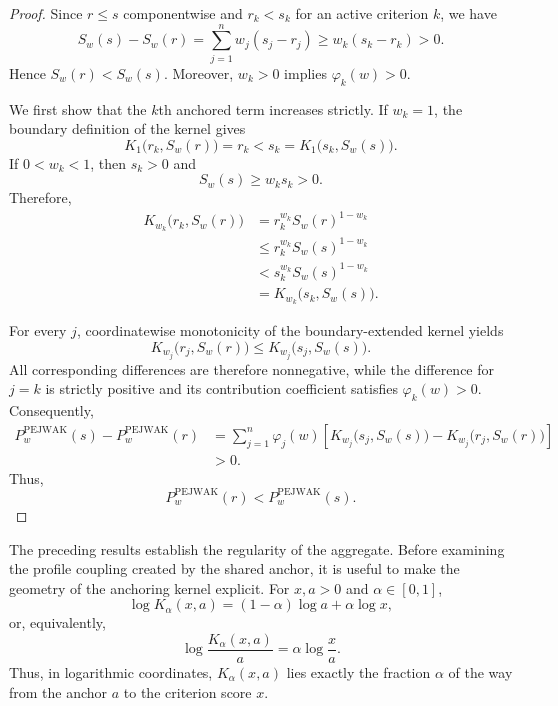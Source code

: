 \documentclass[reqno,11pt]{amsart}
\theoremstyle{definition}
\theoremstyle{plain}
\theoremstyle{remark}
\begin{document}
\begin{proof}
Since $r\leq s$ componentwise and $r_k<s_k$ for an active criterion
$k$, we have
\[
S_w(s)-S_w(r)
=
\sum_{j=1}^{n}w_j(s_j-r_j)
\geq
w_k(s_k-r_k)
>
0.
\]
Hence $S_w(r)<S_w(s)$. Moreover, $w_k>0$ implies
$\varphi_k(w)>0$.

We first show that the $k$th anchored term increases strictly. If
$w_k=1$, the boundary definition of the kernel gives
\[
K_{1}\bigl(r_k,S_w(r)\bigr)
=
r_k
<
s_k
=
K_{1}\bigl(s_k,S_w(s)\bigr).
\]
If $0<w_k<1$, then $s_k>0$ and
\[
S_w(s)\geq w_ks_k>0.
\]
Therefore,
\[
\begin{aligned}
K_{w_k}\bigl(r_k,S_w(r)\bigr)
&=
r_k^{w_k}S_w(r)^{1-w_k}\\
&\leq
r_k^{w_k}S_w(s)^{1-w_k}\\
&<
s_k^{w_k}S_w(s)^{1-w_k}\\
&=
K_{w_k}\bigl(s_k,S_w(s)\bigr).
\end{aligned}
\]

For every $j$, coordinatewise monotonicity of the boundary-extended
kernel yields
\[
K_{w_j}\bigl(r_j,S_w(r)\bigr)
\leq
K_{w_j}\bigl(s_j,S_w(s)\bigr).
\]
All corresponding differences are therefore nonnegative, while the
difference for $j=k$ is strictly positive and its contribution
coefficient satisfies $\varphi_k(w)>0$. Consequently,
\[
\begin{aligned}
P_w^{\mathrm{PEJWAK}}(s)
-
P_w^{\mathrm{PEJWAK}}(r)
&=
\sum_{j=1}^{n}\varphi_j(w)
\left[
K_{w_j}\bigl(s_j,S_w(s)\bigr)
-
K_{w_j}\bigl(r_j,S_w(r)\bigr)
\right]\\
&>0.
\end{aligned}
\]
Thus,
\[
P_w^{\mathrm{PEJWAK}}(r)
<
P_w^{\mathrm{PEJWAK}}(s).
\]
\end{proof}

The preceding results establish the regularity of the aggregate. Before
examining the profile coupling created by the shared anchor, it is useful
to make the geometry of the anchoring kernel explicit. For
$x,a>0$ and $\alpha\in[0,1]$,
\[
\log K_\alpha(x,a)
=
(1-\alpha)\log a
+
\alpha\log x,
\]
or, equivalently,
\begin{equation}
\log
\frac{K_\alpha(x,a)}{a}
=
\alpha
\log
\frac{x}{a}.
\label{eq:exact-log-retention}
\end{equation}
Thus, in logarithmic coordinates, $K_\alpha(x,a)$ lies exactly the
fraction $\alpha$ of the way from the anchor $a$ to the criterion
score $x$.
\end{document}
